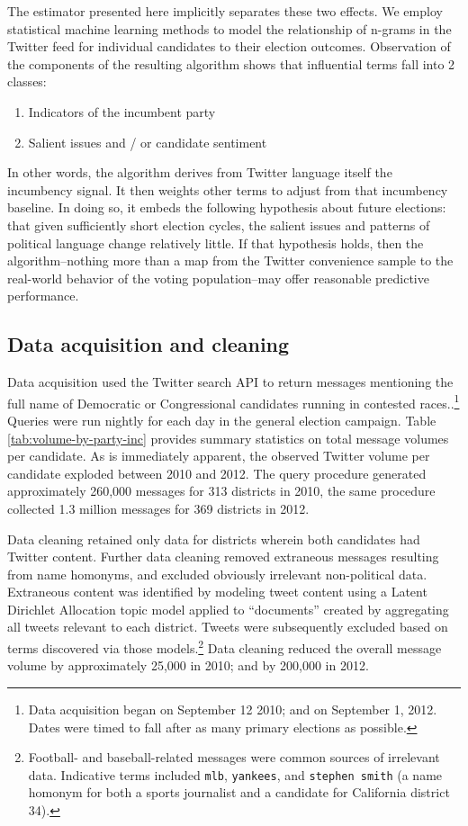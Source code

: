 \documentclass{acm_proc_article-sp}
\begin{document}
The estimator presented here implicitly separates these two
effects. We employ statistical machine learning methods to model the
relationship of n-grams in the Twitter feed for individual candidates
to their election outcomes. Observation of the components of the
resulting algorithm shows that influential terms fall into 2 classes:

\begin{enumerate}
\item Indicators of the incumbent party
\item Salient issues and / or candidate sentiment
\end{enumerate}

In other words, the algorithm derives from Twitter language itself the
incumbency signal. It then weights other terms to adjust from that
incumbency baseline. In doing so, it embeds the following hypothesis
about future elections: that given sufficiently short election cycles,
the salient issues and patterns of political language change
relatively little. If that hypothesis holds, then the
algorithm--nothing more than a map from the Twitter convenience sample
to the real-world behavior of the voting population--may offer
reasonable predictive performance. 

\subsection{Data acquisition and cleaning}
\label{sec:data-acquisition}

Data acquisition used the Twitter search API to return messages
mentioning the full name of Democratic or Congressional candidates
running in contested races..\footnote{Data acquisition began on September 12
2010; and on September 1, 2012. Dates were timed to fall after as many
primary elections as possible.} Queries were run nightly for each day
in the general election campaign. Table
\ref{tab:volume-by-party-inc} provides summary statistics on total
message volumes per candidate. As is immediately apparent, the observed
Twitter volume per candidate exploded between 2010 and 2012. The query
procedure generated approximately 260,000 messages for 313 districts
in 2010, the same procedure collected 1.3 million messages for 369
districts in 2012.  %

Data cleaning retained only
data for districts wherein both candidates had Twitter
content. Further data cleaning removed extraneous messages resulting
from name homonyms, and excluded obviously irrelevant non-political
data. Extraneous content was identified by modeling tweet content
using a Latent Dirichlet Allocation topic model applied to
``documents'' created by aggregating all tweets relevant to each
district. Tweets were subsequently excluded based on terms discovered
via those models.\footnote{Football- and baseball-related messages were
  common sources of irrelevant data. Indicative terms included
  \texttt{mlb}, \texttt{yankees}, and \texttt{stephen smith} (a name
  homonym for both a sports journalist and a candidate for California
  district 34).} Data cleaning reduced the overall message volume
by approximately 25,000 in 2010; and by 200,000 in 2012.
\end{document}
